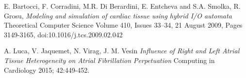 \documentclass[twocolumn]{article}
\begin{document}
\begin{thebibliography}{7}
E. Bartocci, F. Corradini, M.R. Di Berardini, E. Entcheva and S.A. Smolka, R. Grosu, 
\emph{Modeling and simulation of cardiac tissue using hybrid I/O automata}
Theoretical Computer Science
Volume 410, Issues 33–34, 21 August 2009, Pages 3149-3165,
doi:10.1016/j.tcs.2009.02.042


A. Luca, V. Jaquemet, N. Virag, J. M. Vesin
\emph{Influence of Right and Left Atrial Tissue Heterogeneity on
Atrial Fibrillation Perpetuation }
Computing in Cardiology 2015; 42:449-452. 



\end{thebibliography}
\end{document}
